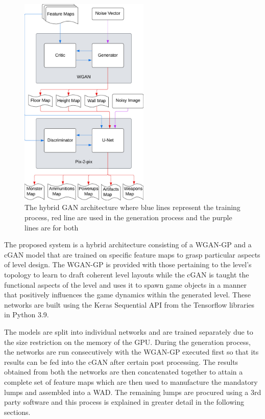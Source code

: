 \documentclass{Configuration_Files/PoliMi3i_thesis}
\begin{document}
\begin{figure}
    \includegraphics[width=0.55\textwidth]{hybrid_architecture.jpeg}
    \caption[Hybrid GAN architecture]{The hybrid GAN architecture where blue 
lines represent the training process, red line are used in the generation process and the purple lines are for both}
    \label{fig:hybridarch}
\end{figure}
The proposed system is a hybrid architecture consisting of a WGAN-GP and a cGAN model that are 
trained on specific feature maps to grasp particular aspects of level design. The 
WGAN-GP is provided with those pertaining to the level's topology to learn to draft coherent level 
layouts while the cGAN is taught the functional aspects of the level and uses it to spawn game 
objects in a manner that positively influences the game dynamics within the generated level. 
These networks are built using the Keras Sequential API from the Tensorflow libraries in Python 3.9.

The models are split into individual networks and are trained separately due to the size restriction on 
the memory of the GPU. During the generation process, the networks are run consecutively 
with the WGAN-GP executed first so that its results can be fed into the cGAN after certain 
post processing. The results obtained from both the networks are then concatenated together 
to attain a complete set of feature maps which are then used to manufacture the mandatory 
lumps and assembled into a WAD. The remaining lumps are procured using a 3rd party software 
and this process is explained in greater detail in the following sections.
\end{document}
